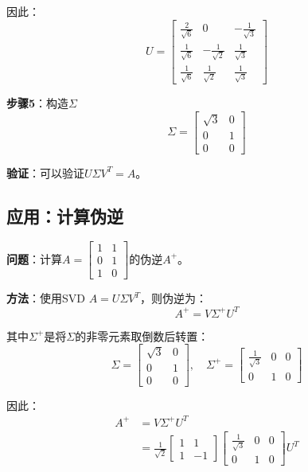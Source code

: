 \documentclass[12pt,a4paper]{article}
\begin{document}
因此：
\begin{equation}
U = \begin{bmatrix}
\frac{2}{\sqrt{6}} & 0 & -\frac{1}{\sqrt{3}} \\
\frac{1}{\sqrt{6}} & -\frac{1}{\sqrt{2}} & \frac{1}{\sqrt{3}} \\
\frac{1}{\sqrt{6}} & \frac{1}{\sqrt{2}} & \frac{1}{\sqrt{3}}
\end{bmatrix}
\end{equation}

\textbf{步骤5}：构造$\Sigma$
\begin{equation}
\Sigma = \begin{bmatrix} \sqrt{3} & 0 \\ 0 & 1 \\ 0 & 0 \end{bmatrix}
\end{equation}

\textbf{验证}：可以验证$U\Sigma V^T = A$。

\subsection{应用：计算伪逆}

\textbf{问题}：计算$A = \begin{bmatrix} 1 & 1 \\ 0 & 1 \\ 1 & 0 \end{bmatrix}$的伪逆$A^+$。

\textbf{方法}：使用SVD $A = U\Sigma V^T$，则伪逆为：
\begin{equation}
A^+ = V \Sigma^+ U^T
\end{equation}

其中$\Sigma^+$是将$\Sigma$的非零元素取倒数后转置：
\begin{equation}
\Sigma = \begin{bmatrix} \sqrt{3} & 0 \\ 0 & 1 \\ 0 & 0 \end{bmatrix}, \quad
\Sigma^+ = \begin{bmatrix} \frac{1}{\sqrt{3}} & 0 & 0 \\ 0 & 1 & 0 \end{bmatrix}
\end{equation}

因此：
\begin{align}
A^+ &= V \Sigma^+ U^T \\
&= \frac{1}{\sqrt{2}} \begin{bmatrix} 1 & 1 \\ 1 & -1 \end{bmatrix} \begin{bmatrix} \frac{1}{\sqrt{3}} & 0 & 0 \\ 0 & 1 & 0 \end{bmatrix} U^T
\end{align}
\end{document}
